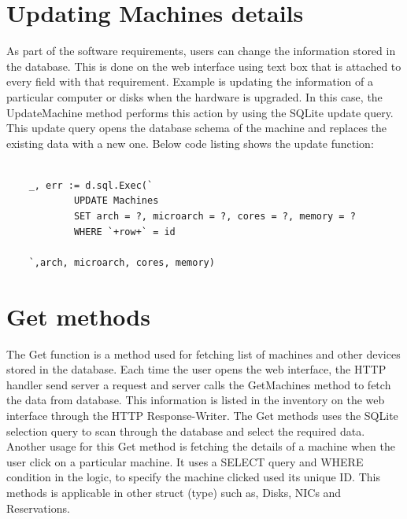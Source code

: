 \section*{Updating Machines details}
As part of the software requirements, users can change the information stored in the database. This is done on the web interface using text box that is attached to every field with that requirement. Example is updating the information of a particular computer or disks when the hardware is upgraded. In this case, the UpdateMachine method performs this action by using the SQLite update query. This update query opens the database schema of the machine and replaces the existing data with a new one.
Below code listing shows the update function:
\begin{lstlisting}[caption=Function for Updating data, label=Update function]

	_, err := d.sql.Exec(`
			UPDATE Machines
			SET arch = ?, microarch = ?, cores = ?, memory = ?
			WHERE `+row+` = id

	`,arch, microarch, cores, memory)

\end{lstlisting}
\section{Get methods}
The Get function is a method used for fetching list of machines and other devices stored in the database. Each time the user opens the web interface, the HTTP handler send server a request and server calls the GetMachines method to fetch the data from database. This information is listed in the inventory on the web interface through the HTTP Response-Writer. The Get methods uses the SQLite selection query to scan through the database and select the required data.  Another usage for this Get method is fetching the details of a machine when the user click on a particular machine. It uses a SELECT query and WHERE condition in the logic, to specify the machine clicked used its unique ID. This methods is applicable in other struct (type) such as, Disks, NICs and Reservations. 
 
